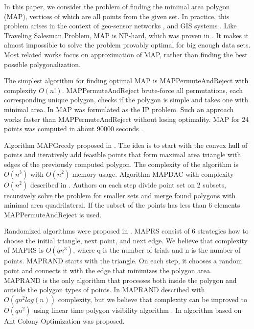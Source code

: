 \documentclass[conference]{IEEEtran}
\begin{document}
		In this paper, we consider the problem of finding the minimal area polygon (MAP), vertices of which are all points from the given set.
		In practice, this problem arises in the context of geo-sensor networks \cite{link1, link2}, and GIS systems \cite{link3, link4}.
		Like Traveling Salesman Problem, MAP is NP-hard, which was proven in \cite{link5}.
		It makes it almost impossible to solve the problem provably optimal for big enough data sets.
		Most related works focus on approximation of MAP, rather than finding the best possible polygonalization.
	
		The simplest algorithm for finding optimal MAP is MAP{\textunderscore}PermuteAndReject with complexity $O(n!)$.
		MAP{\textunderscore}PermuteAndReject brute-force all permutations, each corresponding unique polygon, checks if the polygon is simple and takes one with minimal area.
		In \cite{link9, link10} MAP was formulated as the IP problem. Such an approach works faster than MAP{\textunderscore}PermuteAndReject without losing optimality.
		MAP for 24 points was computed in about 90000 seconds \cite{link10}.
	
		Algorithm MAP{\textunderscore}Greedy proposed in \cite{link8}.
		The idea is to start with the convex hull of points and iteratively add feasible points that form maximal area triangle with edges of the previously computed polygon.
		The complexity of the algorithm is $O(n^{3})$ with $O(n^{2})$ memory usage.
		Algorithm MAP{\textunderscore}DAC with complexity $O(n^{2})$ described in \cite{link13}.
		Authors on each step divide point set on 2 subsets, recursively solve the
		problem for smaller sets and merge found polygons with minimal area quadrilateral.
		If the subset of the points has less than 6 elements MAP{\textunderscore}PermuteAndReject is used.
	
		Randomized algorithms were proposed in \cite{link11, link12}.
		MAP{\textunderscore}RS \cite{link12} consist of 6 strategies how to choose the initial triangle, next point, and next edge.
		We believe that complexity of MAP{\textunderscore}RS is $O(q n^{3})$, where q is the number of trials and n is the number of points.
		MAP{\textunderscore}RAND \cite{link11} starts with the triangle.
		On each step, it chooses a random point and connects it with the edge that minimizes the polygon area.
		MAP{\textunderscore}RAND is the only algorithm that processes both inside the polygon and outside the polygon types of points.
		In \cite{link11} MAP{\textunderscore}RAND described with $O(q n^{2}log(n))$ complexity, but we believe that complexity can be improved to $O(q n^{2})$ using linear time polygon visibility algorithm \cite{link14}.
		In \cite{link12} algorithm based on Ant Colony Optimization was proposed.
	
\end{document}
